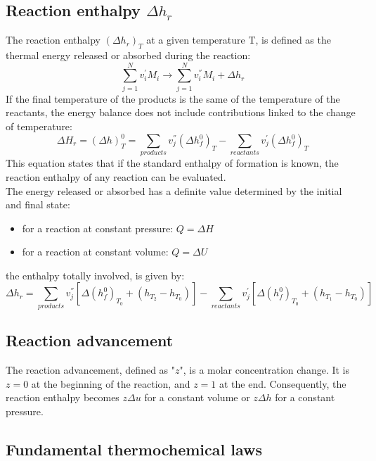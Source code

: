 \documentclass[12pt]{article}
\begin{document}
\subsection{Reaction enthalpy $\Delta h_{r}$}

The reaction enthalpy $(\Delta h_{r})_{T}$ at a given temperature T, is defined as the thermal energy released or absorbed during the reaction:
\begin{equation}
    \sum_{j=1}^{N} v_{i}^{'}M_{i} \rightarrow  \sum_{j=1}^{N} v_{i}^{''}M_{i} + \Delta h_{r}
\end{equation}
If the final temperature of the products is the same of the temperature of the reactants, the energy balance does not include contributions linked to the change of temperature:
\begin{equation}
    \Delta H_{r}=(\Delta h)_{T}^{0}= \sum_{products} v_{j}^{''}(\Delta h_{f}^{0})_{T} -\sum_{reactants} v_{j}^{'}(\Delta h_{f}^{0})_{T}
\end{equation}
This equation states that if the standard enthalpy of formation is known, the reaction enthalpy of any reaction can be evaluated.
\\
The energy released or absorbed has a definite value determined by the initial and final state:
\begin{itemize}
    \item for a reaction at constant pressure: $Q=\Delta H$
    \item for a reaction at constant volume: $Q=\Delta U$
\end{itemize}
the enthalpy totally involved, is given by:
\begin{equation}
    \Delta h_{r}= \sum_{products} v_{j}^{''}[\Delta (h_{f}^{0})_{T_{0}}+(h_{T_{2}}-h_{T_{0}})] -\sum_{reactants} v_{j}^{'}[\Delta (h_{f}^{0})_{T_{0}}+(h_{T_{1}}-h_{T_{0}})]
\end{equation}

\subsection{Reaction advancement}

The reaction advancement, defined as "$z$", is a molar concentration change. It is $z=0$ at the beginning of the reaction, and $z=1$ at the end. Consequently, the reaction enthalpy becomes $z\Delta u$ for a constant volume or $z\Delta h$ for a constant pressure.

\subsection{Fundamental thermochemical laws}
\end{document}
